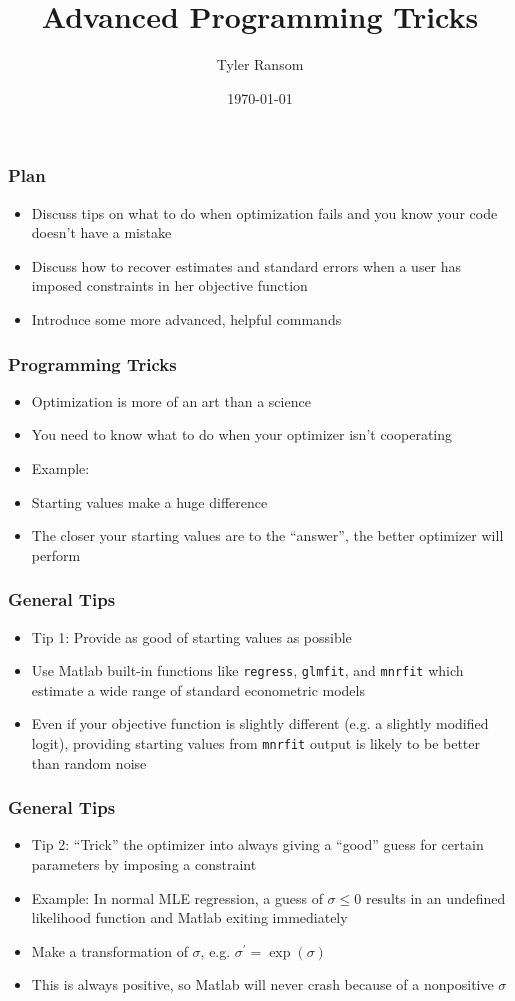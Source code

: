\documentclass[english,xcolor=dvipsnames]{beamer}
\title[]{Advanced Programming Tricks}
\author{Tyler Ransom}
\institute{Duke University}
\date{\today}
\newcommand{\bi}{\begin{itemize}}
\newcommand{\ei}{\end{itemize}}
\begin{document}
\begin{frame}
   \titlepage
\end{frame}

\begin{frame}
\frametitle{Plan}

   \bi 
   \item Discuss tips on what to do when optimization fails and you know your code doesn't have a mistake
   \item Discuss how to recover estimates and standard errors when a user has imposed constraints in her objective function
   \item Introduce some more advanced, helpful commands
   \ei
\end{frame}

\begin{frame}
\frametitle{Programming Tricks}

   \bi 
   \item Optimization is more of an art than a science
   \item You need to know what to do when your optimizer isn't cooperating
   \item Example:
      \item Starting values make a huge difference
      \item The closer your starting values are to the ``answer'', the better optimizer will perform
   \ei
\end{frame}

\begin{frame}
\frametitle{General Tips}

   \bi 
   \item Tip 1: Provide as good of starting values as possible
      \item Use Matlab built-in functions like \texttt{regress}, \texttt{glmfit}, and \texttt{mnrfit} which estimate a wide range of standard econometric models
      \item Even if your objective function is slightly different (e.g. a slightly modified logit), providing starting values from \texttt{mnrfit} output is likely to be better than random noise
   \ei
\end{frame}

\begin{frame}
\frametitle{General Tips}

   \bi 
   \item Tip 2: ``Trick'' the optimizer into always giving a ``good'' guess for certain parameters by imposing a constraint
      \item Example: In normal MLE regression, a guess of $\sigma \leq 0$ results in an undefined likelihood function and Matlab exiting immediately
      \item Make a transformation of $\sigma$, e.g. $\sigma^{\prime} = \exp(\sigma)$
      \item This is always positive, so Matlab will never crash because of a nonpositive $\sigma$
   \ei
\end{frame}
\end{document}
